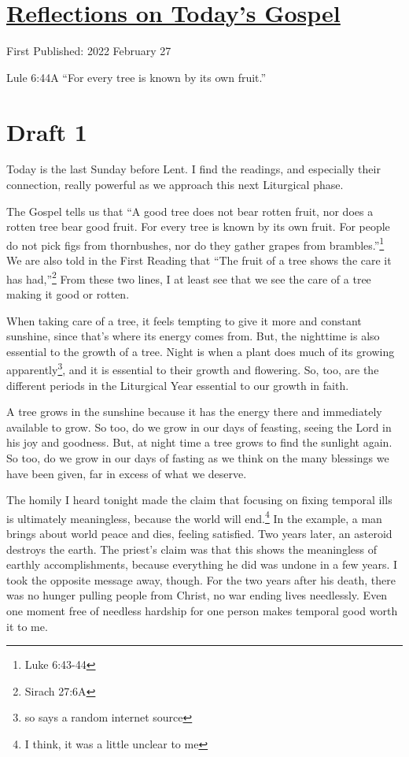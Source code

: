 \documentclass[12pt]{article}[titlepage]
\newcommand{\say}[1]{``#1''}
\newcommand{\1}{\={a}}
\newcommand{\2}{\={e}}
\newcommand{\3}{\={\i}}
\newcommand{\4}{\=o}
\newcommand{\5}{\=u}
\newcommand{\6}{\={A}}
\renewcommand{\,}{\textsuperscript{,}}
\begin{document}
\doublespacing
\section{\href{reflections-on-readings-8-ordinary-c-22.html}{Reflections on Today's Gospel}}
First Published: 2022 February 27

Lule 6:44A \say{For every tree is known by its own fruit.}

\section{Draft 1}
Today is the last Sunday before Lent.
I find the readings, and especially their connection, really powerful as we approach this next Liturgical phase.

The Gospel tells us that \say{A good tree does not bear rotten fruit, nor does a rotten tree bear good fruit. For every tree is known by its own fruit. For people do not pick figs from thornbushes, nor do they gather grapes from brambles.}\footnote{Luke 6:43-44}
We are also told in the First Reading that \say{The fruit of a tree shows the care it has had,}\footnote{Sirach 27:6A}
From these two lines, I at least see that we see the care of a tree making it good or rotten.

When taking care of a tree, it feels tempting to give it more and constant sunshine, since that's where its energy comes from.
But, the nighttime is also essential to the growth of a tree.
Night is when a plant does much of its growing apparently\footnote{so says a random internet source}, and it is essential to their growth and flowering.
So, too, are the different periods in the Liturgical Year essential to our growth in faith.

A tree grows in the sunshine because it has the energy there and immediately available to grow.
So too, do we grow in our days of feasting, seeing the Lord in his joy and goodness.
But, at night time a tree grows to find the sunlight again.
So too, do we grow in our days of fasting as we think on the many blessings we have been given, far in excess of what we deserve.

The homily I heard tonight made the claim that focusing on fixing temporal ills is ultimately meaningless, because the world will end.\footnote{I think, it was a little unclear to me}
In the example, a man brings about world peace and dies, feeling satisfied.
Two years later, an asteroid destroys the earth.
The priest's claim was that this shows the meaningless of earthly accomplishments, because everything he did was undone in a few years.
I took the opposite message away, though.
For the two years after his death, there was no hunger pulling people from Christ, no war ending lives needlessly.
Even one moment free of needless hardship for one person makes temporal good worth it to me.
\end{document}
